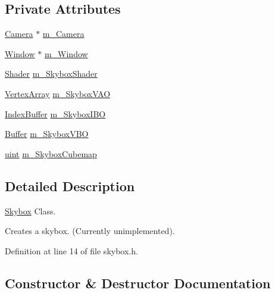 \subsection*{Private Attributes}
\begin{DoxyCompactItemize}
\item 
\hyperlink{classspork_1_1graphics_1_1_camera}{Camera} $\ast$ \hyperlink{classspork_1_1graphics_1_1_skybox_adc3961310ef67eb6db7e06a3e3711768}{m\+\_\+\+Camera}
\item 
\hyperlink{classspork_1_1graphics_1_1_window}{Window} $\ast$ \hyperlink{classspork_1_1graphics_1_1_skybox_aec596e691a2973b70d549bb2feea4da2}{m\+\_\+\+Window}
\item 
\hyperlink{classspork_1_1graphics_1_1_shader}{Shader} \hyperlink{classspork_1_1graphics_1_1_skybox_ad3c7df911441de454ef4e3fd9872185c}{m\+\_\+\+Skybox\+Shader}
\item 
\hyperlink{classspork_1_1graphics_1_1_vertex_array}{Vertex\+Array} \hyperlink{classspork_1_1graphics_1_1_skybox_aa660e5dcfb268f19cc4e877b76fd84de}{m\+\_\+\+Skybox\+V\+AO}
\item 
\hyperlink{classspork_1_1graphics_1_1_index_buffer}{Index\+Buffer} \hyperlink{classspork_1_1graphics_1_1_skybox_a61cdcfe6615ea2215e37de4b5ed9b7ae}{m\+\_\+\+Skybox\+I\+BO}
\item 
\hyperlink{classspork_1_1graphics_1_1_buffer}{Buffer} \hyperlink{classspork_1_1graphics_1_1_skybox_a5a78f895924872ccfb075255238eab24}{m\+\_\+\+Skybox\+V\+BO}
\item 
\hyperlink{defines_8h_a91ad9478d81a7aaf2593e8d9c3d06a14}{uint} \hyperlink{classspork_1_1graphics_1_1_skybox_ab3494040bdb9174637e99384f5dbccb5}{m\+\_\+\+Skybox\+Cubemap}
\end{DoxyCompactItemize}


\subsection{Detailed Description}
\hyperlink{classspork_1_1graphics_1_1_skybox}{Skybox} Class. 

Creates a skybox. (Currently unimplemented). 

Definition at line 14 of file skybox.\+h.



\subsection{Constructor \& Destructor Documentation}
\mbox{\label{classspork_1_1graphics_1_1_skybox_ad86841f1d938a5babf5085bc665da3f3}} 
